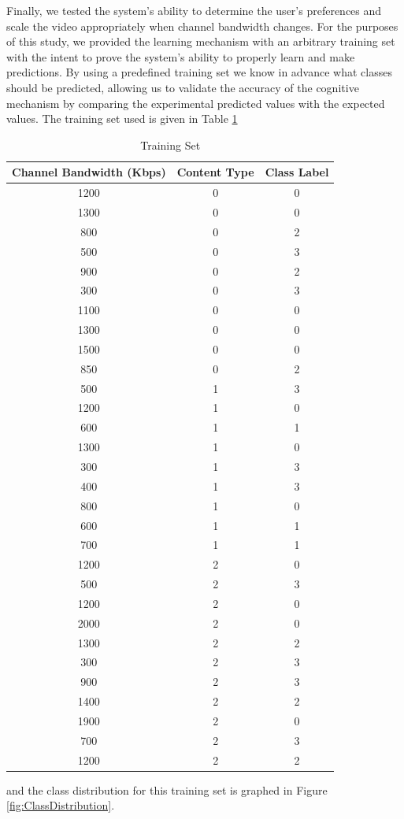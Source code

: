 Finally, we tested the system’s ability to determine the user’s preferences and scale the video appropriately when channel bandwidth changes. For the purposes of this study, we provided the learning mechanism with an arbitrary training set with the intent to prove the system’s ability to properly learn and make predictions. By using a predefined training set we know in advance what classes should be predicted, allowing us to validate the accuracy of the cognitive mechanism by comparing the experimental predicted values with the expected values. The training set used is given in Table \ref{tab:TrainingSet}
\begin{table} [ht]
\centering
\caption{Training Set}
\label{tab:TrainingSet}
\begin{tabular}{c|c|c}
\textbf{Channel Bandwidth (Kbps)}&\textbf{Content Type}&\textbf{Class Label}\\
\hline
1200&0&0\\
1300&0&0\\
800&0&2\\
500&0&3\\
900&0&2\\
300&0&3\\
1100&0&0\\
1300&0&0\\
1500&0&0\\
850&0&2\\
500&1&3\\
1200&1&0\\
600&1&1\\
1300&1&0\\
300&1&3\\
400&1&3\\
800&1&0\\
600&1&1\\
700&1&1\\
1200&2&0\\
500&2&3\\
1200&2&0\\
2000&2&0\\
1300&2&2\\
300&2&3\\
900&2&3\\
1400&2&2\\
1900&2&0\\
700&2&3\\
1200&2&2\\
\end{tabular}
\end{table}
and the class distribution for this training set is graphed in Figure \ref{fig:ClassDistribution}.

